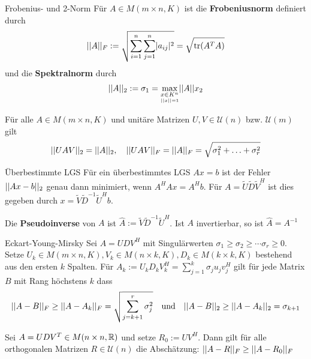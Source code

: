 \begin{definition}{Frobenius- und 2-Norm}
    Für $A \in M(m\times n,K)$ ist die \textbf{Frobeniusnorm} definiert durch
    \begin{align*}
        \Norm{A}_F := \sqrt{
            \sum_{i = 1}^{n} \sum_{j = 1}^{n} \abs{a_{ij}}^2
        } = \sqrt{\trace(A^TA)}
    \end{align*}
    und die \textbf{Spektralnorm} durch
    \begin{align*}
        \Norm{A}_2 :=  \sigma_1 = \max_{\underset{\Norm{x} = 1}{x \in K^n}} \Norm{A}x_2
    \end{align*}
\end{definition}
Für alle $A \in M(m\times n,K)$ und unitäre Matrizen $U,V \in \mathcal{U}(n)$ bzw. $\mathcal{U}(m)$ gilt
\begin{align*}
    \vert\vert UAV\vert\vert_2 = \vert\vert A\vert\vert_2, \quad \vert\vert UAV\vert\vert_F = \vert\vert A\vert\vert_F = \sqrt{\sigma_1^2 + \ldots + \sigma_r^2}
\end{align*}


\begin{satz}{Überbestimmte LGS}
    Für ein überbestimmtes LGS $Ax = b$ ist der Fehler $\vert\vert Ax - b\vert\vert_2$ genau dann minimiert, wenn $A^HAx = A^Hb$. Für $A = \tilde{U}\tilde{D} \tilde{V}^H$ ist dies gegeben durch $x = \tilde{V} \tilde{D}^{-1}\tilde{U}^Hb$.

    Die \textbf{Pseudoinverse} von $A$ ist $\hat{A} := \tilde{V} \tilde{D}^{-1}\tilde{U}^{H}$. Ist $A$ invertierbar, so ist $\hat{A} = A^{-1}$
\end{satz}

\begin{satz}{Eckart-Young-Mirsky}
    Sei $A = UDV^{H}$ mit Singulärwerten $\sigma_1 \geq \sigma_2 \geq \cdots \sigma_r \geq 0$. Setze $U_k \in M(m\times n,K), V_k \in M(n\times k,K), D_k \in M(k\times k,K)$ bestehend aus den ersten $k$ Spalten.
    Für $A_k := U_kD_kV_k^{H} = \sum_{j = 1}^{k}\sigma_j u_j v_j^H$ gilt für jede Matrix $B$ mit Rang höchstens $k$ dass 
    \begin{align*}
        \vert\vert A - B\vert\vert_F \geq \vert\vert A - A_k\vert\vert_F = \sqrt{\sum_{j = k+1}^{r}\sigma_j^2} \quad \text{und} \quad \vert\vert A - B\vert\vert_2 \geq \vert\vert A - A_k\vert\vert_2 = \sigma_{k+1}
    \end{align*}
\end{satz}

Sei $A = UDV^T \in M(n\times n,\mathbb{R})$ und setze $R_0 := UV^{H}$. Dann gilt für alle orthogonalen Matrizen $R \in \mathcal{U}(n)$ die Abschätzung: $\vert\vert A-R\vert\vert_F \geq \vert\vert A - R_0\vert\vert_F$


